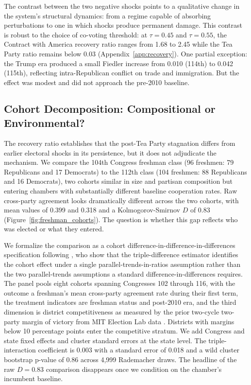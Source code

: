 \documentclass[12pt, a4paper]{article}
\begin{document}
The contrast between the two negative shocks points to a qualitative change in the system's structural dynamics: from a regime capable of absorbing perturbations to one in which shocks produce permanent damage. This contrast is robust to the choice of co-voting threshold: at $\tau = 0.45$ and $\tau = 0.55$, the Contract with America recovery ratio ranges from 1.68 to 2.45 while the Tea Party ratio remains below 0.03 (Appendix~\ref{app:recovery}). One partial exception: the Trump era produced a small Fiedler increase from 0.010 (114th) to 0.042 (115th), reflecting intra-Republican conflict on trade and immigration. But the effect was modest and did not approach the pre-2010 baseline.

\subsection{Cohort Decomposition: Compositional or Environmental?}\label{subsec:cohort_ddd}

The recovery ratio establishes that the post-Tea Party stagnation differs from earlier electoral shocks in its persistence, but it does not adjudicate the mechanism. We compare the 104th Congress freshman class (96 freshmen: 79 Republicans and 17 Democrats) to the 112th class (104 freshmen: 88 Republicans and 16 Democrats), two cohorts similar in size and partisan composition but entering chambers with substantially different baseline cooperation rates. Raw cross-party agreement looks dramatically different across the two cohorts, with mean values of 0.399 and 0.318 and a Kolmogorov-Smirnov $D$ of 0.83 (Figure~\ref{fig:freshman_cohorts}). The question is whether this gap reflects who was elected or what they entered.

We formalize the comparison as a cohort difference-in-difference-in-differences specification following \citet{olden2022triple}, who show that the triple-difference estimator identifies the cohort effect under a single parallel-trends-in-ratios assumption rather than the two parallel-trends assumptions a standard difference-in-differences requires. The panel pools eight cohorts spanning Congresses 102 through 116, with the outcome a freshman's mean cross-party agreement rate during their first term, the treatment indicators are freshman status and post-2010 era, and the third dimension is district competitiveness as measured by the prior two-cycle two-party margin of victory from MIT Election Lab data \citep{medsl2024house}. Districts with margins below 10 percentage points enter the competitive stratum. We add Congress and state fixed effects and cluster standard errors at the state level. The triple-interaction coefficient is 0.003 with a standard error of 0.018 and a wild cluster bootstrap p-value of 0.86 across 4,999 Rademacher draws. The headline of the raw $D = 0.83$ comparison disappears once we condition on the chamber's incumbent baseline.
\end{document}
